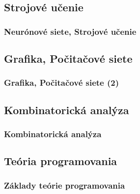 \documentclass{beamer}
\begin{document}
\subsection{Strojové učenie}
% 


\begin{frame}
\frametitle{Neurónové siete, Strojové učenie}
\end{frame}

\subsection{Grafika, Počitačové siete}
% 
% 


\begin{frame}
\frametitle{Grafika, Počitačové siete (2)}
\end{frame}

\subsection{Kombinatorická analýza}
% 
% 

\begin{frame}
\frametitle{Kombinatorická analýza}
\end{frame}

\subsection{Teória programovania}
% 


\begin{frame}
\frametitle{Základy teórie programovania}
\end{frame}

% 
\end{document}
